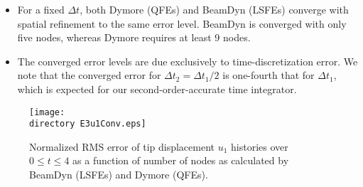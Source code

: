 \begin{itemize}

    \item For a fixed $\Delta t$, both Dymore (QFEs) and BeamDyn (LSFEs)
converge with spatial refinement to the same error level. BeamDyn is
converged with only five nodes, whereas Dymore requires at least 9 nodes.

    \item  The converged error levels are due exclusively to
time-discretization error.  We note that the converged error for $\Delta t_2
= \Delta t_1/2$ is one-fourth that for $\Delta t_1$, which is expected for our
second-order-accurate time integrator.  


\end{itemize}  

\begin{figure}
    \centering
    \texttt{[image: \\directory E3u1Conv.eps]}
    \caption{Normalized RMS error of tip displacement $u_1$ histories over
$0 \leq t \leq 4$ as a function of number of nodes as calculated by BeamDyn
(LSFEs) and Dymore (QFEs).}
    \label{E3Conv}
\end{figure}
 
